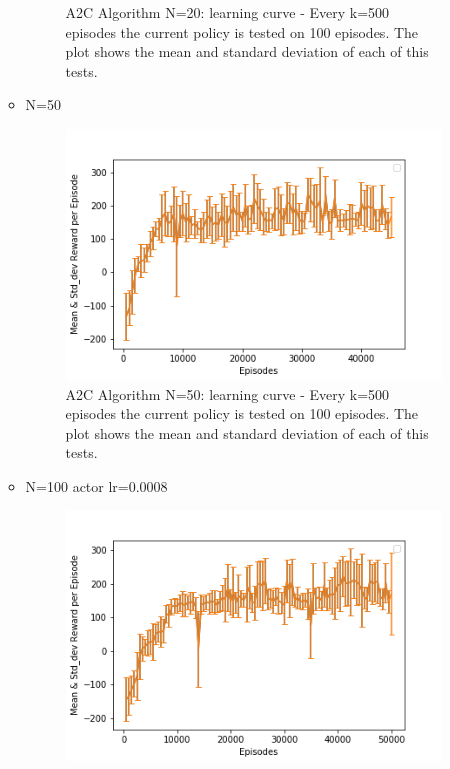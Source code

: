 \documentclass[12pt]{article}
\begin{document}
\begin{enumerate}
\begin{itemize}
\begin{figure}[H]
\begin{center}
				\end{center}
				\caption{A2C Algorithm N=20: learning curve - Every k=500 episodes the current policy is tested on 100 episodes. The plot shows the mean and standard deviation of each of this tests.  } 	\label{3}%
			\end{figure}
			\item N=50
			\begin{figure}[H]
				\begin{center} 
					\includegraphics[scale=.73]{figures/A2C_LC_N=50_45.png}
				\end{center}
				\caption{A2C Algorithm N=50: learning curve - Every k=500 episodes the current policy is tested on 100 episodes. The plot shows the mean and standard deviation of each of this tests.  } 	\label{4}%
			\end{figure}
			\item N=100 actor lr=0.0008
			\begin{figure}[H]
				\begin{center} 
					\includegraphics[scale=.73]{figures/A2C_LC_N=100_50.png}
				\end{center}

\end{figure}
\end{itemize}
\end{enumerate}
\end{document}

